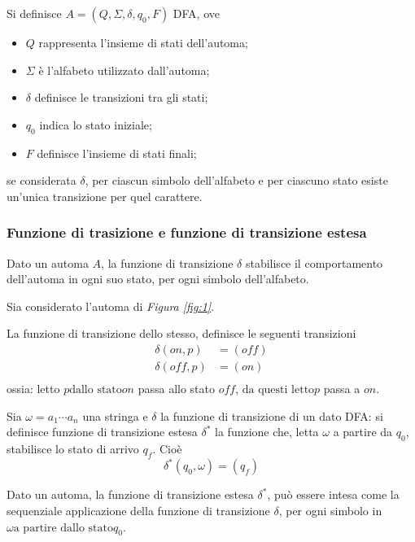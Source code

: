 \documentclass{subfiles}
\begin{document}
\begin{Definition*}
    Si definisce \(A = (Q, \Sigma, \delta, q_{0}, F)\) DFA, ove
    \begin{itemize}
        \item \emph{\(Q\)} rappresenta l'insieme di stati dell'automa;
        \item \emph{\(\Sigma\)} è l'alfabeto utilizzato dall'automa;
        \item \emph{\(\delta\)} definisce le transizioni tra gli stati;
        \item \emph{\(q_{0}\)} indica lo stato iniziale;
        \item \emph{\(F\)} definisce l'insieme di stati finali;
    \end{itemize}
    se considerata \(\delta\), per ciascun simbolo dell'alfabeto e per ciascuno stato esiste un'unica transizione per quel carattere.
\end{Definition*}

\subsubsection{Funzione di trasizione e funzione di transizione estesa}
Dato un automa \(A\), la funzione di transizione \(\delta\) stabilisce il comportamento dell'automa in ogni suo stato, per ogni simbolo dell'alfabeto.
\begin{Example*}
    Sia considerato l'automa di \emph{Figura \eqref{fig:1}}.

    \noindent La funzione di transizione dello stesso, definisce le seguenti transizioni
    \[\begin{aligned}
            \delta(on, p)  & = (off) \\
            \delta(off, p) & = (on)  \\
        \end{aligned}\]
    ossia: letto \(p \text{dallo stato} on\) passa allo stato \(off \text{, da questi letto} p\) passa a \(on\).
\end{Example*}

\begin{Definition*}
    Sia \(\omega = a_{1} \cdots a_{n}\) una stringa e \(\delta\) la funzione di transizione di un dato DFA:
    si definisce funzione di transizione estesa \(\delta^{*}\) la funzione che, letta \(\omega\) a partire da \(q_{0}\), stabilisce lo stato di arrivo \(q_{f}\). Cioè
    \[
        \delta^{*}(q_{0}, \omega) = (q_{f})
    \]

    \begin{Remark*}
        Dato un automa, la funzione di transizione estesa \(\delta^{*}\), può essere intesa come la sequenziale applicazione della funzione di transizione \(\delta\),
        per ogni simbolo in \(\omega \text{a partire dallo stato} q_{0}\).
    \end{Remark*}
\end{Definition*}
\end{document}
